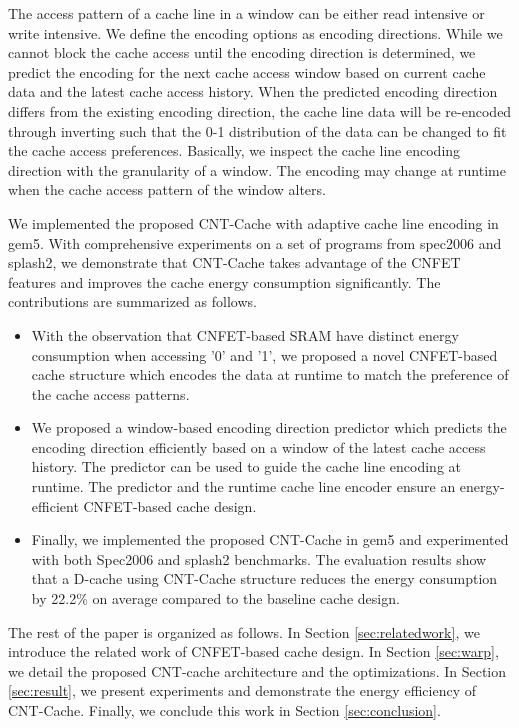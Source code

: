 The access pattern of a cache line in a window can be either read 
intensive or write intensive. %
We define the encoding options as encoding directions.
While we cannot block the cache access until the encoding direction is determined, 
we predict the encoding for the next cache access window based on current 
cache data and the latest cache access history. When the predicted encoding direction
differs from the existing encoding direction, the cache line data will be re-encoded 
through inverting such that the 0-1 distribution of the data can be changed to fit 
the cache access preferences. Basically, we inspect the cache line encoding direction 
with the granularity of a window. The encoding may change at runtime when the 
cache access pattern of the window alters. 

We implemented the proposed CNT-Cache with adaptive cache line encoding in 
gem5\cite{binkert2011gem5}. With comprehensive experiments on 
a set of programs from spec2006 and splash2, we demonstrate that CNT-Cache 
takes advantage of the CNFET features and improves the cache energy 
consumption significantly. The contributions are summarized as follows.
\begin{itemize}
    \item With the observation that CNFET-based SRAM have distinct energy
    consumption when accessing '0' and '1', we proposed a novel CNFET-based cache structure 
    which encodes the data at runtime to match the preference of the cache access patterns.
    
    \item We proposed a window-based encoding direction predictor 
    which predicts the encoding direction efficiently based on a window 
    of the latest cache access history. The predictor can be used to guide 
    the cache line encoding at runtime. The predictor and the runtime 
    cache line encoder ensure an energy-efficient CNFET-based cache design.
    
    \item Finally, we implemented the proposed CNT-Cache in gem5 and experimented with both 
    Spec2006 and splash2 benchmarks. The evaluation results show that a D-cache using 
    CNT-Cache structure reduces the energy consumption by 22.2\% on average compared to 
    the baseline cache design.
\end{itemize}

The rest of the paper is organized as follows. In Section \ref{sec:relatedwork},  
we introduce the related work of CNFET-based cache design. 
In Section \ref{sec:warp}, we detail the proposed CNT-cache architecture and the 
optimizations. In Section \ref{sec:result}, we present experiments 
and demonstrate the energy efficiency of CNT-Cache. Finally, we conclude this 
work in Section \ref{sec:conclusion}.


